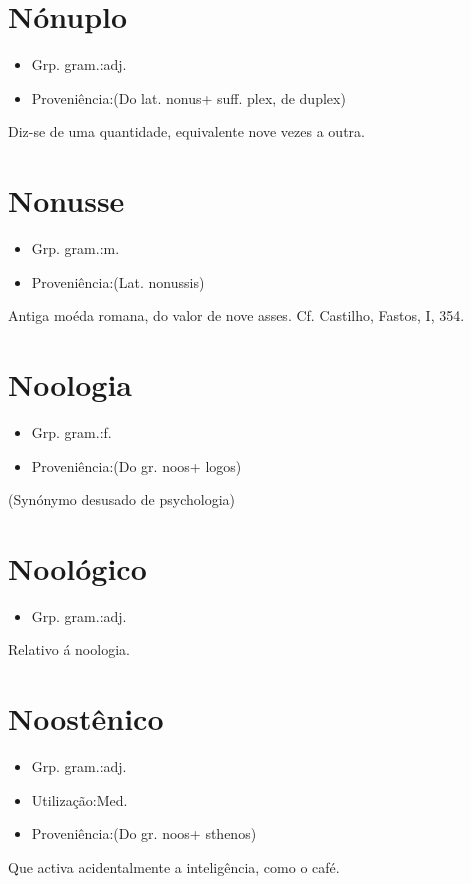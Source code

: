 \section{Nónuplo}
\begin{itemize}
\item {Grp. gram.:adj.}
\end{itemize}
\begin{itemize}
\item {Proveniência:(Do lat. \textunderscore nonus\textunderscore  + suff. \textunderscore plex\textunderscore , de \textunderscore duplex\textunderscore )}
\end{itemize}
Diz-se de uma quantidade, equivalente nove vezes a outra.
\section{Nonusse}
\begin{itemize}
\item {Grp. gram.:m.}
\end{itemize}
\begin{itemize}
\item {Proveniência:(Lat. \textunderscore nonussis\textunderscore )}
\end{itemize}
Antiga moéda romana, do valor de nove asses. Cf. Castilho, \textunderscore Fastos\textunderscore , I, 354.
\section{Noologia}
\begin{itemize}
\item {Grp. gram.:f.}
\end{itemize}
\begin{itemize}
\item {Proveniência:(Do gr. \textunderscore noos\textunderscore  + \textunderscore logos\textunderscore )}
\end{itemize}
(Synónymo desusado de \textunderscore psychologia\textunderscore )
\section{Noológico}
\begin{itemize}
\item {Grp. gram.:adj.}
\end{itemize}
Relativo á noologia.
\section{Noostênico}
\begin{itemize}
\item {Grp. gram.:adj.}
\end{itemize}
\begin{itemize}
\item {Utilização:Med.}
\end{itemize}
\begin{itemize}
\item {Proveniência:(Do gr. \textunderscore noos\textunderscore  + \textunderscore sthenos\textunderscore )}
\end{itemize}
Que activa acidentalmente a inteligência, como o café.

